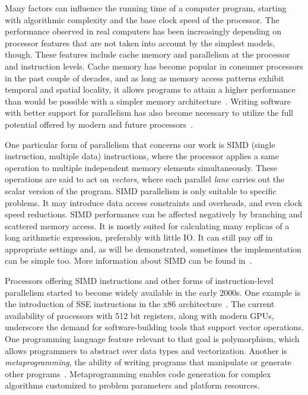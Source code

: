 \documentclass{juliacon}
\begin{document}
Many factors can influence the running time of a computer program, starting with algorithmic complexity and the base clock speed of the processor. The performance observed in real computers has been increasingly depending on processor features that are not taken into account by the simplest models, though. These features include cache memory and parallelism at the processor and instruction levels. Cache memory has become popular in consumer processors in the past couple of decades, and as long as memory access patterns exhibit temporal and spatial locality, it allows programs to attain a higher performance than would be possible with a simpler memory architecture~\cite[Chapter 3]{Drepper07whatevery}. Writing software with better support for parallelism has also become necessary to utilize the full potential offered by modern and future processors~\cite{wilson2018}.

One particular form of parallelism that concerns our work is SIMD (single instruction, multiple data) instructions, where the processor applies a same operation to multiple independent memory elements simultaneously. These operations are said to act on {\em vectors}, where each parallel {\em lane} carries out the scalar version of the program. SIMD parallelism is only suitable to specific problems. It may introduce data access constraints and overheads, and even clock speed reductions. SIMD performance can be affected negatively by branching and scattered memory access. It is mostly suited for calculating many replicas of a long arithmetic expression, preferably with little IO. It can still pay off in appropriate settings and, as will be demonstrated, sometimes the implementation can be simple too. More information about SIMD can be found in~\cite{SIMDtut}.

Processors offering SIMD instructions and other forms of instruction-level parallelism started to become widely available in the early 2000s. One example is the introduction of SSE instructions in the x86 architecture~\cite[Chapter 1]{kusswurm18}. The current availability of processors with 512 bit registers, along with modern GPUs, underscore the demand for software-building tools that support vector operations. One programming language feature relevant to that goal is polymorphism, which allows programmers to abstract over data types and vectorization. Another is {\em metaprogramming}, the ability of writing programs that manipulate or generate other programs~\cite{Abelson1996}\cite[Ch.25]{JuliaDocs}. Metaprogramming enables code generation for complex algorithms customized to problem parameters and platform resources.
\end{document}
